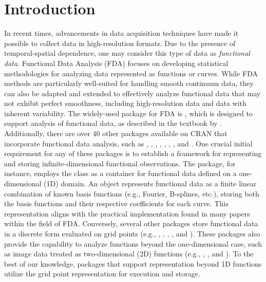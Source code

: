 \section{Introduction}\label{sec:introduction}
In recent times, advancements in data acquisition techniques have made it possible to collect data in high-resolution formats. Due to the presence of temporal-spatial dependence, one may consider this type of data as \textit{functional data}.
Functional Data Analysis (FDA) focuses on developing statistical methodologies for analyzing data represented as functions or curves. While FDA methods are particularly well-suited for handling smooth continuum data, they can also be adapted and extended to effectively analyze functional data that may not exhibit perfect smoothness, including high-resolution data and data with inherent variability.
The widely-used  package for FDA is  \citep{fdapackage}, which is designed to support analysis of functional data, as described in the textbook by \cite{ramsay2005}. Additionally, there are over 40 other  packages available on CRAN that incorporate functional data analysis, such as  \citep{funFEMpackage},  \citep{fdauscpackage},  \citep{refundpackage},  \citep{fdapacepackage},  \citep{funDatapackage},  \citep{ftsspecpackage},  \citep{rainbowpackage}, and  \citep{ftsapackage}.
One crucial initial requirement for any of these packages is to establish a framework for representing and storing infinite-dimensional functional observations. The  package, for instance, employs the  class as a container for functional data defined on a one-dimensional (1D) domain. An  object represents functional data as a finite linear combination of known basis functions (e.g., Fourier, B-splines, etc.), storing both the basis functions and their respective coefficients for each curve. This representation aligns with the practical implementation found in many papers within the field of FDA. Conversely, several other  packages store functional data in a discrete form evaluated on grid points (e.g., , , , , and ). These packages also provide the capability to analyze functions beyond the one-dimensional case, such as image data treated as two-dimensional (2D) functions (e.g., , , and ). To the best of our knowledge, packages that support representation beyond 1D functions utilize the grid point representation for execution and storage.
